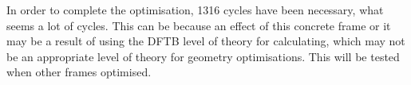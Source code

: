 			In order to complete the optimisation, 1316 cycles have been necessary, what seems a lot of cycles. This can be because an effect of this concrete frame or it may be a result of using the DFTB level of theory for calculating, which may not be an appropriate level of theory for geometry optimisations. This will be tested when other frames optimised.
		
		
		
		
		
	
		
	


	
	
	
	
	
	
	
	
	
	
	
	
	
	
	
	
	
	
	
	
	
	
	
	
	
	
	
	
	
	
	
		
		
